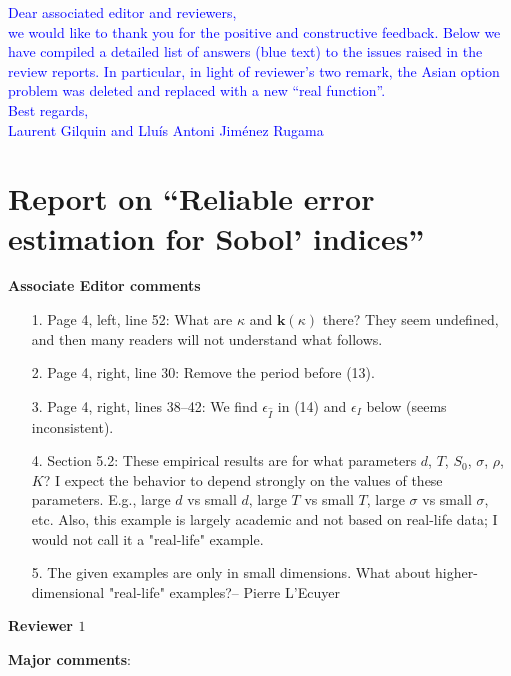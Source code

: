 \documentclass[10pt,a4paper]{article}
\newcommand{\vect}[1]{\boldsymbol{\mathbf{#1}}}
\newcommand{\vk}{\vect{k}}
\begin{document}
\textcolor{blue}{Dear associated editor and reviewers,\\
we would like to thank you for the positive and constructive feedback. Below we have
compiled a detailed list of answers (blue text) to the issues raised in the review reports. In particular, in light of reviewer's two remark, the Asian option problem was deleted and replaced with a new ``real function''.\\
Best regards,\\
Laurent Gilquin and Llu\'{i}s Antoni Jim\'{e}nez Rugama}

\section*{Report on ``Reliable error estimation for Sobol' indices''}

\textbf{\large{Associate Editor comments}}
\vspace*{0.5cm}

\begin{itemize}
\item[1.] Page 4, left, line 52: What are $\kappa$ and $\vk(\kappa)$ there? They seem undefined, and then many readers will not understand what follows.
\item[2.] Page 4, right, line 30: Remove the period before (13).
\item[3.] Page 4, right, lines 38--42: We find $\epsilon_{\hat I}$ in (14) and $\epsilon_{I}$ below (seems inconsistent).
\item[4.] Section 5.2: These empirical results are for what parameters $d$, $T$, $S_0$, $\sigma$, $\rho$, $K$? I expect the behavior to depend strongly on the values of these parameters. E.g., large $d$ vs small $d$, large $T$ vs small $T$, large $\sigma$ vs small $\sigma$, etc. Also, this example is largely academic and not based on real-life data; I would not call it a "real-life" example. 
\item[5.] The given examples are only in small dimensions. What about higher-dimensional "real-life" examples?-- Pierre L'Ecuyer
\end{itemize}




\textbf{\large{Reviewer $1$}}
\vspace*{0.5cm}

\textbf{Major comments}:
\end{document}
